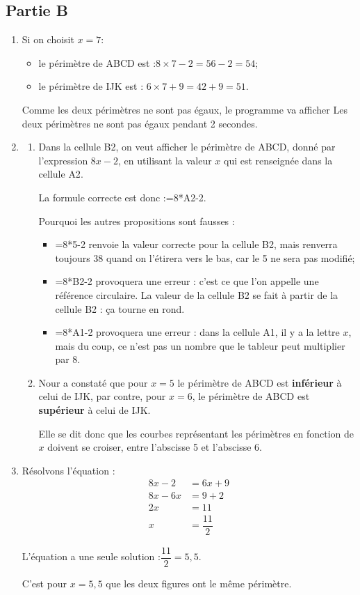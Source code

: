 \subsection*{Partie B}
\begin{enumerate}
	\item Si on choisit $x = 7$:
	\begin{itemize}
		\item le périmètre de ABCD est :\quad $8 \times 7 - 2 = 56 - 2 = 54$;
		\item le périmètre de IJK est : \quad $6 \times 7 + 9 = 42 + 9 = 51$.
	\end{itemize}
	Comme les deux périmètres ne sont pas égaux, le programme va afficher \og Les deux périmètres ne sont pas égaux \fg{} pendant 2 secondes.

	\item \begin{enumerate}
		\item Dans la cellule \textsf{B2}, on veut afficher le périmètre de ABCD, donné par l'expression $8x - 2$, en utilisant la valeur $x$ qui est renseignée dans la cellule \textsf{A2}.

		La formule correcte est donc :\quad \textsf{=8*A2-2}.

		Pourquoi les autres propositions sont fausses :
		\begin{itemize}
			\item \textsf{=8*5-2} \quad renvoie la valeur correcte pour la cellule \textsf{B2}, mais renverra toujours 38 quand on l'étirera vers le bas, car le \textsf{5} ne sera pas modifié;
			\item \textsf{=8*B2-2} \quad provoquera une erreur : c'est ce que l'on appelle une référence circulaire. La valeur de la cellule \textsf{B2} se fait à partir de la cellule \textsf{B2} : ça tourne en rond.
			\item \textsf{=8*A1-2} \quad provoquera une erreur : dans la cellule \textsf{A1}, il y a la lettre $x$, mais du coup, ce n'est pas un nombre que le tableur peut multiplier par 8.
		\end{itemize}

		\item Nour a constaté que pour $x = 5$ le périmètre de ABCD est \textbf{inférieur} à celui de IJK, par contre, pour $x = 6$, le périmètre de ABCD est \textbf{supérieur} à celui de IJK.

		Elle se dit donc que les courbes représentant les périmètres en fonction de $x$ doivent se croiser, entre l'abscisse 5 et l'abscisse 6.
	\end{enumerate}
	\item Résolvons l'équation :
	\begin{align*}
		8x - 2  & = 6x + 9        \\
		8x - 6x & = 9 + 2         \\
		2x      & = 11            \\
		x       & = \dfrac{11}{2}
	\end{align*}

	L'équation a une seule solution :\quad $\dfrac{11}{2} = 5,5$.

	C'est pour $x = 5,5$ que les deux figures ont le même périmètre.
\end{enumerate}

